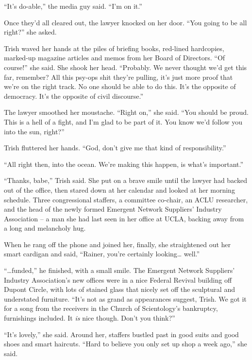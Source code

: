 “It's do-able,” the media guy said. “I'm on it.”

Once they'd all cleared out, the lawyer knocked on her door. “You 
going to be all right?” she asked.

Trish waved her hands at the piles of briefing books, red-lined 
hardcopies, marked-up magazine articles and memos from her Board of 
Directors. “Of course!” she said. She shook her head. “Probably. 
We never thought we'd get this far, remember? All this psy-ops shit 
they're pulling, it's just more proof that we're on the right track. No 
one should be able to do this. It's the opposite of democracy. It's the 
opposite of civil discourse.”

The lawyer smoothed her moustache. “Right on,” she said. “You 
should be proud. This is a hell of a fight, and I'm glad to be part of 
it. You know we'd follow you into the sun, right?”

Trish fluttered her hands. “God, don't give me that kind of 
responsibility.”

“All right then, into the ocean. We're making this happen, is what's 
important.”

“Thanks, babe,” Trish said. She put on a brave smile until the 
lawyer had backed out of the office, then stared down at her calendar 
and looked at her morning schedule. Three congressional staffers, a 
committee co-chair, an ACLU researcher, and the head of the newly 
formed Emergent Network Suppliers' Industry Association -- a man she 
had last seen in her office at UCLA, backing away from a long and 
melancholy hug.

\tb

When he rang off the phone and joined her, finally, she straightened 
out her smart cardigan and said, “Rainer, you're certainly looking\ldots{} 
well.”

“\ldots{}funded,” he finished, with a small smile. The Emergent Network 
Suppliers' Industry Association's new offices were in a nice Federal 
Revival building off Dupont Circle, with lots of stained glass that 
nicely set off the sculptural and understated furniture. “It's not as 
grand as appearances suggest, Trish. We got it for a song from the 
receivers in the Church of Scientology's bankruptcy, furnishings 
included. It \emph{is} nice though. Don't you think?”

“It's lovely,” she said. Around her, staffers bustled past in good 
suits and good shoes and smart haircuts. “Hard to believe you only 
set up shop a week ago,” she said.

